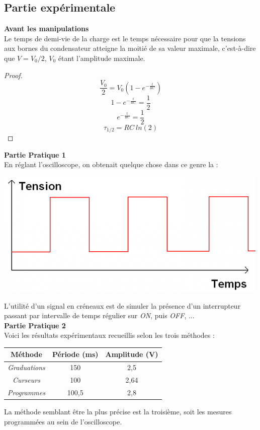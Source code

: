 \documentclass	[11pt, a4paper, openany]{book}
\begin{document}
\newpage
\subsection{Partie expérimentale}
\textbf{Avant les manipulations}\\
Le temps de demi-vie de la charge est le temps nécessaire pour que la tensions aux bornes du condensateur atteigne la moitié de sa valeur maximale, c'est-à-dire que $V = V_0/2$, $V_0$ étant l'amplitude maximale.
\begin{proof}
\begin{equation}
\frac{V_0}{2} = V_0 \left(1-e^{-\frac{t}{RC}}\right)
\end{equation}
\begin{equation}
1 - e^{-\frac{t}{RC}} = \frac{1}{2}
\end{equation}
\begin{equation}
e^{-\frac{t}{RC}} = \frac{1}{2}
\end{equation}
\begin{equation}
\tau_{1/2} = RC\ ln(2)
\end{equation}
\end{proof}

\textbf{Partie Pratique 1}\\
En réglant l'oscilloscope, on obtenait quelque chose dans ce genre la :
\begin{center}
\includegraphics[scale=0.5]{labo/image17.png}
\end{center}
L'utilité d'un signal en créneaux est de simuler la présence d'un interrupteur passant par intervalle de temps régulier sur \textit{ON}, puis \textit{OFF}, ... \\

\textbf{Partie Pratique 2}\\
Voici les résultats expérimentaux recueillis selon les trois méthodes : 
\begin{center}
 \begin{tabular}{|c|c|c|}
\hline 
\textbf{Méthode} & \textbf{Période} (ms) & \textbf{Amplitude} (V) \\ 
\hline 
\textit{Graduations} & 150 & 2,5 \\ 
\hline 
\textit{Curseurs} & 100 & 2,64 \\ 
\hline 
\textit{Programmes} & 100,5 & 2,8 \\ 
\hline 
\end{tabular}
\end{center}
La méthode semblant être la plus précise est la troisième, soit les mesures programmées au sein de l'oscilloscope.\\
\end{document}
